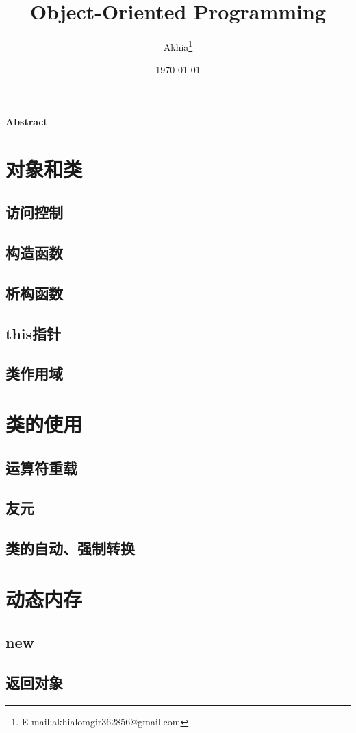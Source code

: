 \documentclass[UTF8,a4paper,12pt]{article}
\title{Object-Oriented Programming}
\author{Akhia\thanks{E-mail:akhialomgir362856@gmail.com}}
\date{\today}
\begin{document}
\maketitle
\begin{center}
    \large\textbf{Abstract}
\end{center}
\newpage
\tableofcontents
\newpage
\section{对象和类}
\subsection{访问控制}
\subsection{构造函数}
\subsection{析构函数}
\subsection{this指针}
\subsection{类作用域}
\newpage
\section{类的使用}
\subsection{运算符重载}
\subsection{友元}
\subsection{类的自动、强制转换}
\newpage
\section{动态内存}
\subsection{new}
\subsection{返回对象}
\end{document}
